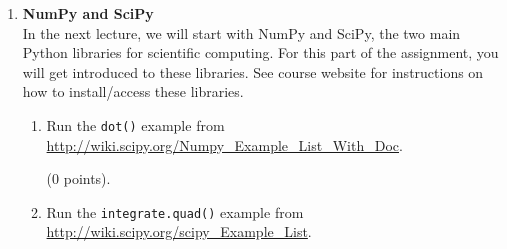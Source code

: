 \documentclass{article}
\newcounter{points}
\newcommand\setpoints[1]{\addtocounter{points}{#1}(#1 points)}
\begin{document}
\begin{enumerate}
\begin{enumerate}
\setcounter{enumii}{2}
\item Repeat part (a) in the file \texttt{coordinates\_dicts.py}.  These functions use dictionaries instead of tuples to represent points.  Again, \texttt{cart2sphere()} has been implemented for you.  For $cos^{-1}$, use \texttt{math.acos()}; for $\sin^{-1}$, use \texttt{math.asin()}; and for $\tan^{-1}$, use \texttt{math.atan2()}.  \setpoints{9}
\end{enumerate}

\begin{enumerate}
\setcounter{enumii}{3}
\item Implement \texttt{detect\_type()} in the file \texttt{coordinates\_dicts.py}.  This function determines what type of coordinate system is being used based on the keys in the dictionary.  \setpoints{5} \\
\end{enumerate}

\textbf{Grading}:

To grade this question, tests will be conducted by calling the functions you implement.  Each test is worth 0 points (do not pass test) or 1 point (pass test).  There are 30 total tests.

Gaming the autograder by hard-coding the answers of the provided test functions is considered cheating and a violation of the Stanford honor code.  I will be testing your code with additional (unreleased) tests to ensure that there is no cheating.

\newpage
\item \textbf{NumPy and SciPy} \\
In the next lecture, we will start with NumPy and SciPy, the two main Python libraries for scientific computing.  For this part of the assignment, you will get introduced to these libraries.  See course website for instructions on how to install/access these libraries.

\begin{enumerate}
\item Run the \texttt{dot()} example from \url{http://wiki.scipy.org/Numpy_Example_List_With_Doc}.

\setpoints{0}.
\end{enumerate}

\begin{enumerate}
\setcounter{enumii}{1}
\item Run the \texttt{integrate.quad()} example from \url{http://wiki.scipy.org/scipy_Example_List}.


\end{enumerate}
\end{enumerate}
\end{document}
